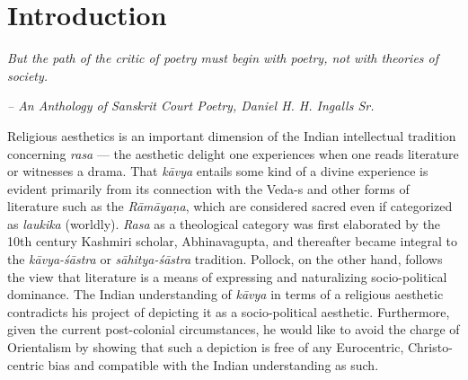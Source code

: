 \section*{Introduction}

\textsl{But the path of the critic of poetry must begin with poetry, not with theories of society.}

\hfill \textsl{-- An Anthology of Sanskrit Court Poetry, Daniel H. H. Ingalls Sr.}

\smallskip

Religious aesthetics is an important dimension of the Indian intellectual tradition concerning \textsl{rasa} --- the aesthetic delight one experiences when one reads literature or witnesses a drama. That \textsl{kāvya} entails some kind of a divine experience is evident primarily from its connection with the Veda-s and other forms of literature such as the \textsl{Rāmāyaṇa}, which are considered sacred even if categorized as \textsl{laukika} (worldly). \textsl{Rasa} as a theological category was first elaborated by the 10th century Kashmiri scholar, Abhinavagupta, and thereafter became integral to the \textsl{kāvya-śāstra} or \textsl{sāhitya-śāstra} tradition. Pollock, on the other hand, follows the view that literature is a means of expressing and naturalizing socio-political dominance. The Indian understanding of \textsl{kāvya} in terms of a religious aesthetic contradicts his project of depicting it as a socio-political aesthetic. Furthermore, given the current post-colonial circumstances, he would like to avoid the charge of Orientalism by showing that such a depiction is free of any Eurocentric, Christo-centric bias and compatible with the Indian understanding as such.

